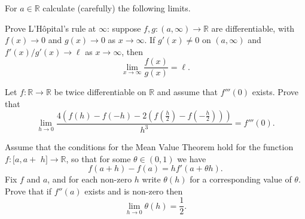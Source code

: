 \documentclass[answers]{exam}
\begin{document}
\begin{questions}



\question%
For $a \in \mathbb{R}$ calculate (carefully) the following limits.



\question%
Prove L'Hôpital's rule at $\infty$: suppose $f, g:(a, \infty) \to \mathbb{R}$ are differentiable, with $f(x) \to 0$ and $g(x) \to 0$ as $x \to \infty$. If $g'(x) \neq 0$ on $(a, \infty)$ and $f'(x) / g'(x) \to \ell$ as $x \to \infty$, then \[
	\lim _{x \to \infty} \frac{f(x)}{g(x)}=\ell.
\]



\question%
Let $f: \mathbb{R} \to \mathbb{R}$ be twice differentiable on $\mathbb{R}$ and assume that $f'''(0)$ exists. Prove that \[
	\lim _{h \to 0} \frac{4\left(f(h)-f(-h)-2\left(f\left(\frac{h}{2}\right)-f\left(-\frac{h}{2}\right)\right)\right)}{h^{3}}=f'''(0).
\]



\question%
Assume that the conditions for the Mean Value Theorem hold for the function $f:[a, a+$ $h] \to \mathbb{R}$, so that for some $\theta \in(0,1)$ we have \[
	f(a+h)-f(a)=h f'(a+\theta h) .
\] Fix $f$ and $a$, and for each non-zero $h$ write $\theta(h)$ for a corresponding value of $\theta$. Prove that if $f''(a)$ exists and is non-zero then \[
	\lim _{h \to 0} \theta(h)=\frac{1}{2}.
\]




\end{questions}
\end{document}

